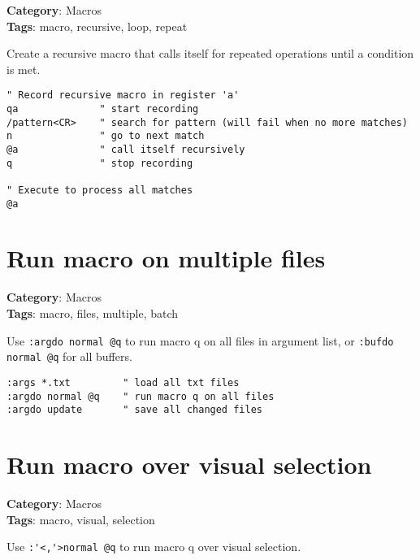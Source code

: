 {{{{{{\textbf{Category}: Macros\\ \textbf{Tags}: macro, recursive, loop, repeat
\vspace{0.5cm}

Create a recursive macro that calls itself for repeated operations until a condition is met.

\begin{Exa*}{}
\begin{Verbatim}[fontsize=\footnotesize, breaklines, breakanywhere]
" Record recursive macro in register 'a'
qa              " start recording
/pattern<CR>    " search for pattern (will fail when no more matches)
n               " go to next match
@a              " call itself recursively
q               " stop recording

" Execute to process all matches
@a
\end{Verbatim}
\end{Exa*}

\section{Run macro on multiple files}

\textbf{Category}: Macros\\ \textbf{Tags}: macro, files, multiple, batch
\vspace{0.5cm}

Use {\footnotesize \Verb§:argdo normal @q§} to run macro q on all files in argument list, or {\footnotesize \Verb§:bufdo normal @q§} for all buffers.

\begin{Exa*}{}
\begin{Verbatim}[fontsize=\footnotesize, breaklines, breakanywhere]
:args *.txt         " load all txt files
:argdo normal @q    " run macro q on all files
:argdo update       " save all changed files
\end{Verbatim}
\end{Exa*}

\section{Run macro over visual selection}

\textbf{Category}: Macros\\ \textbf{Tags}: macro, visual, selection
\vspace{0.5cm}

Use {\footnotesize \Verb§:'<,'>normal @q§} to run macro q over visual selection.

}}}}}}
